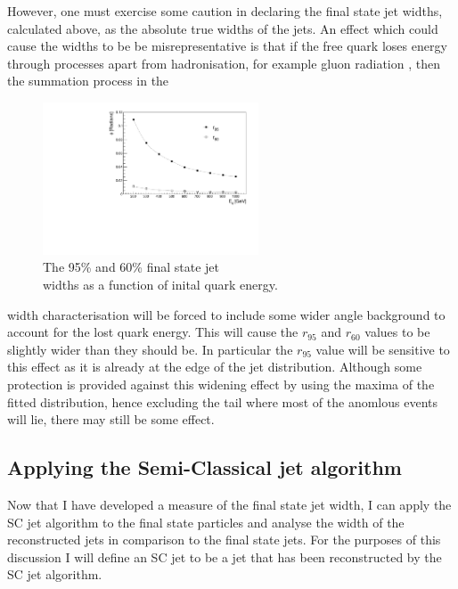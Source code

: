 \documentclass[a4paper,11pt, onecolumn]{article}
\begin{document}
  However, one must exercise some caution in declaring the final state jet widths, calculated above, as the absolute true widths of the jets. 
  An effect which could cause the widths to be be misrepresentative is that if the free quark loses energy through processes apart from 
  hadronisation, for example gluon radiation \cite{jetquench}, then the summation process in the
  \begin{figure}
    \begin{center}
      \includegraphics[width = 0.57\textwidth]{r_q.pdf}
      \caption{The 95\% and 60\% final state jet\\ 
               widths as a function of inital quark energy.}
      \label{r q}
    \end{center}
  \end{figure}
  width characterisation will be forced to include some wider angle background to account for the lost quark energy.
  This will cause the $r_{95}$ and $r_{60}$ values to be slightly wider than they should be.
  In particular the $r_{95}$ value will be sensitive to this effect as it is already at the edge of the jet distribution. 
  Although some protection is provided against this widening effect by using the maxima of the fitted distribution, hence excluding the tail 
  where most of the anomlous events will lie, there may still be some effect. \\
  
  \vspace{-1cm}
  \subsection{Applying the Semi-Classical jet algorithm} \label{ss sc}
  
 
  Now that I have developed a measure of the final state jet width,
  I can apply the SC jet algorithm to the final state particles and analyse the width of the reconstructed jets 
  in comparison to the final state jets. For the purposes of this discussion I will define an SC jet to be a jet that has
  been reconstructed by the SC jet algorithm. \\
  
\end{document}

